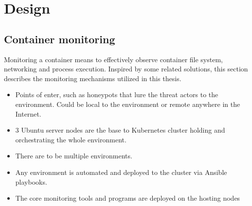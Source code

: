 \chapter{Design \label{design}}

\section{Container monitoring \label{design:con-mon}}
Monitoring a container means to effectively observe container file system, networking and process execution. Inspired by some related solutions, this section describes the monitoring mechanisms utilized in this thesis.

\begin{itemize}
	\item 
	Points of enter, such as honeypots that lure the threat actors to the environment. Could be local to the environment or remote anywhere in the Internet.
	\item 
	3 Ubuntu server nodes are the base to Kubernetes cluster holding and orchestrating the whole environment.
	\item 
	There are to be multiple environments.
	\item
	Any environment is automated and deployed to the cluster via Ansible playbooks.
	\item 
	The core monitoring tools and programs are deployed on the hosting nodes
\end{itemize}